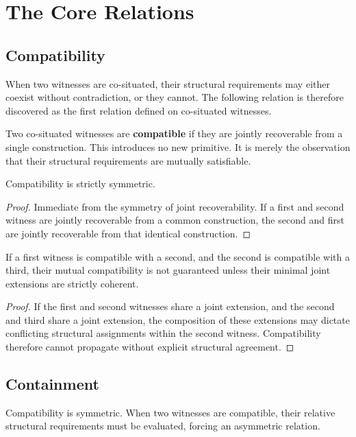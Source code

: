 \documentclass[12pt,anyside]{book}
\begin{document}
\section{The Core Relations}

\subsection{Compatibility}
When two witnesses are co-situated, their structural requirements may either coexist without contradiction, or they cannot. The following relation is therefore discovered as the first relation defined on co-situated witnesses.

Two co-situated witnesses are \textbf{compatible} if they are jointly recoverable from a single construction. This introduces no new primitive. It is merely the observation that their structural requirements are mutually satisfiable. 

\begin{theorem}
Compatibility is strictly symmetric.
\end{theorem}
\begin{proof}
Immediate from the symmetry of joint recoverability. If a first and second witness are jointly recoverable from a common construction, the second and first are jointly recoverable from that identical construction.
\end{proof}

\begin{theorem}
If a first witness is compatible with a second, and the second is compatible with a third, their mutual compatibility is not guaranteed unless their minimal joint extensions are strictly coherent.
\end{theorem}
\begin{proof}
If the first and second witnesses share a joint extension, and the second and third share a joint extension, the composition of these extensions may dictate conflicting structural assignments within the second witness. Compatibility therefore cannot propagate without explicit structural agreement.
\end{proof}

\subsection{Containment}
Compatibility is symmetric. When two witnesses are compatible, their relative structural requirements must be evaluated, forcing an asymmetric relation. 
\end{document}
